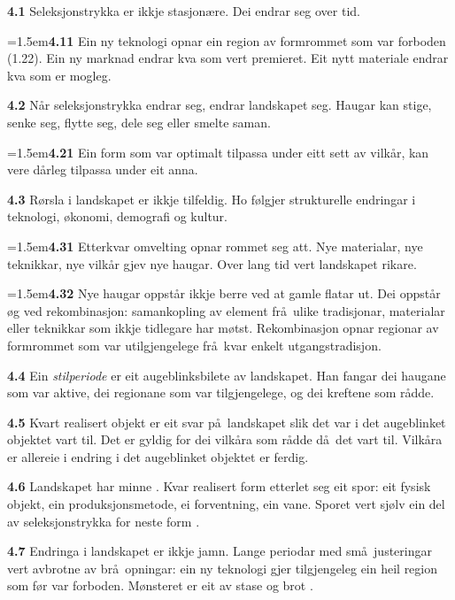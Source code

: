 \documentclass[11pt, a4paper]{article}
\newcommand{\subprop}[1]{\medskip\noindent\textbf{#1}\quad}
\newcommand{\subsubprop}[1]{\smallskip\hangindent=1.5em\noindent\hspace{1.5em}\textbf{#1}\quad}
\begin{document}
\subprop{4.1} Seleksjonstrykka er ikkje stasjon\ae re. Dei endrar seg over tid.

\subsubprop{4.11} Ein ny teknologi opnar ein region av formrommet som var forboden (1.22). Ein ny marknad endrar kva som vert premieret. Eit nytt materiale endrar kva som er mogleg.

\subprop{4.2} N\aa r seleksjonstrykka endrar seg, endrar landskapet seg. Haugar kan stige, senke seg, flytte seg, dele seg eller smelte saman.

\subsubprop{4.21} Ein form som var optimalt tilpassa under eitt sett av vilk\aa r, kan vere d\aa rleg tilpassa under eit anna.

\subprop{4.3} R\o rsla i landskapet er ikkje tilfeldig. Ho f\o lgjer strukturelle endringar i teknologi, \o konomi, demografi og kultur.

\subsubprop{4.31} Etterkvar omvelting opnar rommet seg att. Nye materialar, nye teknikkar, nye vilk\aa r gjev nye haugar. Over lang tid vert landskapet rikare.

\subsubprop{4.32} Nye haugar oppst\aa r ikkje berre ved at gamle flatar ut. Dei oppst\aa r \o g ved rekombinasjon: samankopling av element fr\aa\ ulike tradisjonar, materialar eller teknikkar som ikkje tidlegare har m\o tst. Rekombinasjon opnar regionar av formrommet som var utilgjengelege fr\aa\ kvar enkelt utgangstradisjon.

\subprop{4.4} Ein \textit{stilperiode} er eit augeblinksbilete av landskapet. Han fangar dei haugane som var aktive, dei regionane som var tilgjengelege, og dei kreftene som r\aa dde.

\subprop{4.5} Kvart realisert objekt er eit svar p\aa\ landskapet slik det var i det augeblinket objektet vart til. Det er gyldig for dei vilk\aa ra som r\aa dde d\aa\ det vart til. Vilk\aa ra er allereie i endring i det augeblinket objektet er ferdig.

\subprop{4.6} Landskapet har minne \citep[jf.][]{boyd1985, henrich2016}. Kvar realisert form etterlet seg eit spor: eit fysisk objekt, ein produksjonsmetode, ei forventning, ein vane. Sporet vert sj\o lv ein del av seleksjonstrykka for neste form \citep[jf.][]{kubler1962}.

\subprop{4.7} Endringa i landskapet er ikkje jamn. Lange periodar med sm\aa\ justeringar vert avbrotne av br\aa\ opningar: ein ny teknologi gjer tilgjengeleg ein heil region som f\o r var forboden. M\o nsteret er eit av stase og brot \citep[jf.\ \textit{punctuated equilibrium} i][]{eldredge1972}.
\end{document}
